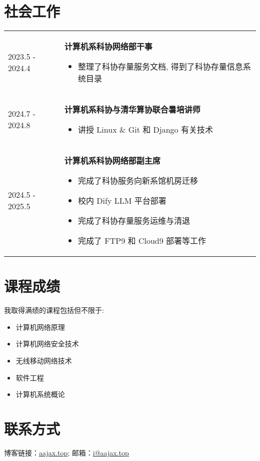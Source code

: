 \documentclass[a4paper, 10pt]{article}
\begin{document}
\section*{社会工作}
\noindent
\begin{tabular}{p{}p{}}
    2023.5 - 2024.4 & \textbf{计算机系科协网络部干事}
        \fontsize{8pt}{10pt}\selectfont
        \begin{itemize}[left=0pt,topsep=0pt,partopsep=0pt,parsep=0pt,itemsep=0pt]
            \item 整理了科协存量服务文档, 得到了科协存量信息系统目录
        \end{itemize} \\

    2024.7 - 2024.8 & \textbf{计算机系科协与清华算协联合暑培讲师}
        \fontsize{8pt}{10pt}\selectfont
        \begin{itemize}[left=0pt,topsep=0pt,partopsep=0pt,parsep=0pt,itemsep=0pt]
            \item 讲授 Linux \& Git 和 Django 有关技术
        \end{itemize} \\

    2024.5 - 2025.5 & \textbf{计算机系科协网络部副主席}
        \fontsize{8pt}{10pt}\selectfont
        \begin{itemize}[left=0pt,topsep=0pt,partopsep=0pt,parsep=0pt,itemsep=0pt]
            \item 完成了科协服务向新系馆机房迁移
            \item 校内 Dify LLM 平台部署
            \item 完成了科协存量服务运维与清退
            \item 完成了 FTP9 和 Cloud9 部署等工作
        \end{itemize}
\end{tabular}

\section*{课程成绩}
\noindent 我取得满绩的课程包括但不限于:
\begin{itemize}[left=20pt]
    \setlength{\itemsep}{0pt}
    \item 计算机网络原理
    \item 计算机网络安全技术
    \item 无线移动网络技术
    \item 软件工程
    \item 计算机系统概论
\end{itemize}

\section*{联系方式}
\noindent 博客链接：\href{https://aajax.top}{aajax.top}; 邮箱：\href{mailto:i@aajax.top}{i@aajax.top}
\end{document}
